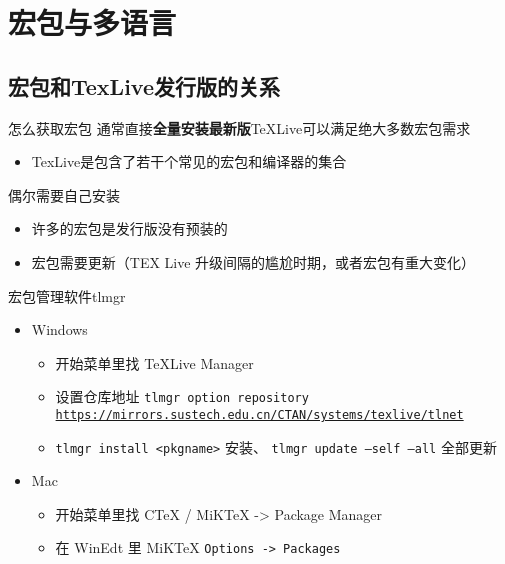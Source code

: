 \section{宏包与多语言}
\subsection{宏包和TexLive发行版的关系}
\begin{frame}{怎么获取宏包}
	通常直接\textbf{全量安装最新版}TeXLive可以满足绝大多数宏包需求
	\begin{itemize}
		\item TexLive是包含了若干个常见的宏包和编译器的集合
	\end{itemize}
	偶尔需要自己安装
	\begin{itemize}
		\item 许多的宏包是发行版没有预装的
		\item 宏包需要更新（TEX Live 升级间隔的尴尬时期，或者宏包有重大变化）
	\end{itemize}
	宏包管理软件tlmgr
	\begin{itemize}
		\item<+-> Windows
		      \begin{itemize}
			      \item 开始菜单里找 TeXLive Manager
			      \item 设置仓库地址 \texttt{tlmgr option repository \url{https://mirrors.sustech.edu.cn/CTAN/systems/texlive/tlnet}}
			      \item \texttt{tlmgr install <pkgname>} 安装、 \texttt{tlmgr update --self --all} 全部更新
		      \end{itemize}
		\item<+-> Mac
		      \begin{itemize}
			      \item 开始菜单里找 CTeX / MiKTeX -> Package Manager
			      \item 在 WinEdt 里 MiKTeX \texttt{Options -> Packages}
		      \end{itemize}
	\end{itemize}
	\vspace{0.4cm} %
\end{frame}

